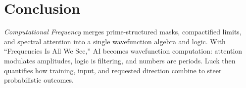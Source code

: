 \documentclass[12pt]{article}
\begin{document}
\section{Conclusion}
\emph{Computational Frequency} merges prime-structured masks, compactified limits, and spectral attention into a single wavefunction algebra and logic. With “Frequencies Is All We See,” AI becomes wavefunction computation: attention modulates amplitudes, logic is filtering, and numbers are periods. Luck then quantifies how training, input, and requested direction combine to steer probabilistic outcomes.



\end{document}
